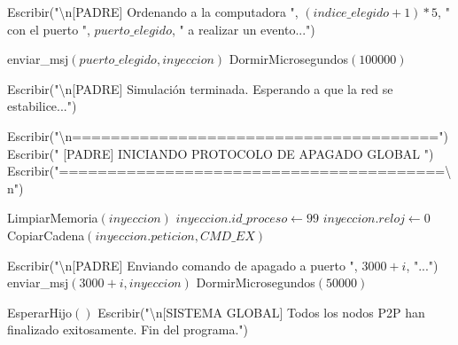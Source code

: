 \begin{tcolorbox}[colback=white, colframe=azul_unam, title=Pseudocódigo: sinc\_lamport.c (P2P), breakable]
\begin{algorithmic}[1]
        \State Escribir("\textbackslash n[PADRE] Ordenando a la computadora ", $(indice\_elegido + 1) * 5$, " con el puerto ", $puerto\_elegido$, " a realizar un evento...")
        
        \State enviar\_msj$(puerto\_elegido, inyeccion)$
        \State DormirMicrosegundos$(100000)$
        
    \EndFor

    \State Escribir("\textbackslash n[PADRE] Simulación terminada. Esperando a que la red se estabilice...")
    
    \State Escribir("\textbackslash n======================================")
    \State Escribir(" [PADRE] INICIANDO PROTOCOLO DE APAGADO GLOBAL ")
    \State Escribir("========================================\textbackslash n")

        
        \State LimpiarMemoria$(inyeccion)$
        \State $inyeccion.id\_proceso \gets 99$
        \State $inyeccion.reloj \gets 0$
        \State CopiarCadena$(inyeccion.peticion, CMD\_EX)$
        
        \State Escribir("\textbackslash n[PADRE] Enviando comando de apagado a puerto ", $3000 + i$, "...")
        \State enviar\_msj$(3000 + i, inyeccion)$
        \State DormirMicrosegundos$(50000)$
        
    \EndFor

    \State EsperarHijo$()$
    \State Escribir("\textbackslash n[SISTEMA GLOBAL] Todos los nodos P2P han finalizado exitosamente. Fin del programa.")

\EndIf

\State {}

\EndProcedure

\end{algorithmic}
\end{tcolorbox}


